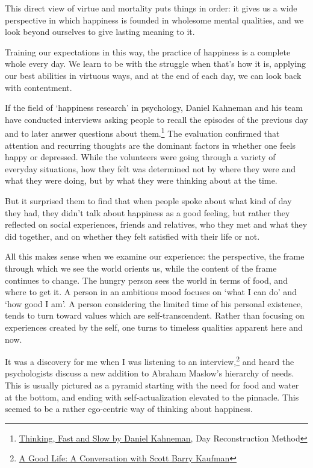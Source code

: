 \enlargethispage*{2\baselineskip}

This direct view of virtue and mortality puts things in order: it gives
us a wide perspective in which happiness is founded in wholesome mental
qualities, and we look beyond ourselves to give lasting meaning to it.

Training our expectations in this way, the practice of happiness is a
complete whole every day. We learn to be with the struggle when that's
how it is, applying our best abilities in virtuous ways, and at the end
of each day, we can look back with contentment.

If the field of `happiness research' in psychology, Daniel Kahneman and
his team have conducted interviews asking people to recall the episodes
of the previous day and to later answer questions about them.\footnote{\href{https://www.goodreads.com/book/show/11468377-thinking-fast-and-slow}{Thinking,
  Fast and Slow by Daniel Kahneman}, Day Reconstruction Method} The
evaluation confirmed that attention and recurring thoughts are the
dominant factors in whether one feels happy or depressed. While the
volunteers were going through a variety of everyday situations, how they
felt was determined not by where they were and what they were doing, but
by what they were thinking about at the time.


\enlargethispage*{3\baselineskip}

But it surprised them to find that when people spoke about what kind of
day they had, they didn't talk about happiness as a good feeling, but
rather they reflected on social experiences, friends and relatives, who
they met and what they did together, and on whether they felt satisfied
with their life or not.

All this makes sense when we examine our experience: the perspective,
the frame through which we see the world orients us, while the content
of the frame continues to change. The hungry person sees the world in
terms of food, and where to get it. A person in an ambitious mood
focuses on `what I can do' and `how good I am'. A person considering the
limited time of his personal existence, tends to turn toward values
which are self-transcendent. Rather than focusing on experiences created
by the self, one turns to timeless qualities apparent here and now.

It was a discovery for me when I was listening to an
interview,\footnote{\href{https://www.samharris.org/podcasts/making-sense-episodes/209-a-good-life}{A
  Good Life: A Conversation with Scott Barry Kaufman}} and heard the
psychologists discuss a new addition to Abraham Maslow's hierarchy of
needs. This is usually pictured as a pyramid starting with the need for
food and water at the bottom, and ending with self-actualization
elevated to the pinnacle. This seemed to be a rather ego-centric way of
thinking about happiness.

